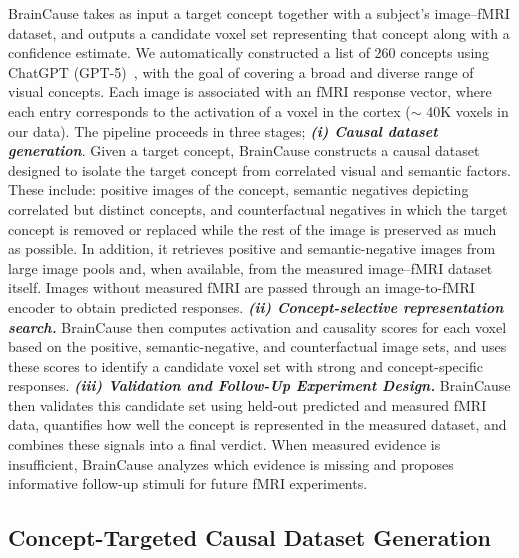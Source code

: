 \documentclass{article}
\begin{document}
BrainCause takes as input a target concept together with a subject's image--fMRI dataset, and outputs a candidate voxel set representing that concept along with a confidence estimate. We automatically constructed a list of 260 concepts using ChatGPT (GPT-5)~\cite{openai2025gpt5systemcard}, with the goal of covering a broad and diverse range of visual concepts.
Each image is associated with an fMRI response vector, where each entry corresponds to the activation of a voxel in the cortex ($\sim$ 40K voxels in our data).
The pipeline proceeds in three stages; \textbf{\textit{(i) Causal dataset generation}}. Given a target concept, BrainCause constructs a causal dataset designed to isolate the target concept from correlated visual and semantic factors. These include: 
positive images of the concept, semantic negatives depicting correlated but distinct concepts, and counterfactual negatives in which the target concept is removed or replaced while the rest of the image is preserved as much as possible. In addition, it retrieves positive and semantic-negative images from large image pools and, when available, from the measured image--fMRI dataset itself. Images without measured fMRI are passed through an image-to-fMRI encoder to obtain predicted responses. \textbf{\emph{(ii) Concept-selective representation search.}} BrainCause then computes activation and causality scores for each voxel based on the positive, semantic-negative, and counterfactual image sets, and uses these scores to identify a candidate voxel set with strong and concept-specific responses. \textbf{\emph{(iii) Validation and Follow-Up Experiment Design.}} BrainCause then validates this candidate set using held-out predicted and measured fMRI data, quantifies how well the concept is represented in the measured dataset, and combines these signals into a final verdict. When measured evidence is insufficient, BrainCause analyzes which evidence is missing and proposes informative follow-up stimuli for future fMRI experiments. 

 
\subsection{Concept-Targeted Causal Dataset Generation}
\label{sec:method:Steps:Generation}
\end{document}
